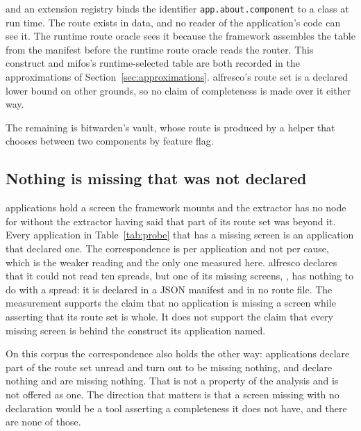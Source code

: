 \noindent
and an extension registry binds the identifier \texttt{app.about.component} to a class at run time. The route exists in data, and no reader of the application's code can see it. The runtime route oracle sees it because the framework assembles the table from the manifest before the runtime route oracle reads the router. This construct and mifos's runtime-selected table are both recorded in the approximations of Section~\ref{sec:approximations}. alfresco's route set is a declared lower bound on other grounds, so no claim of completeness is made over it either way.

The remaining \ProbeMissedBitwarden{} is bitwarden's vault, whose route is produced by a helper that chooses between two components by feature flag.

\subsection{Nothing is missing that was not declared}

\ProbeMissedWithoutDeclaration{} applications hold a screen the framework mounts and the extractor has no node for without the extractor having said that part of its route set was beyond it. Every application in Table~\ref{tab:probe} that has a missing screen is an application that declared one. The correspondence is per application and not per cause, which is the weaker reading and the only one measured here. alfresco declares that it could not read ten spreads, but one of its \ProbeMissedAlfresco{} missing screens, , has nothing to do with a spread: it is declared in a JSON manifest and in no route file. The measurement supports the claim that no application is missing a screen while asserting that its route set is whole. It does not support the claim that every missing screen is behind the construct its application named.

On this corpus the correspondence also holds the other way: \ProbeDeclaredButComplete{} applications declare part of the route set unread and turn out to be missing nothing, and \ProbeSilentAndComplete{} declare nothing and are missing nothing. That is not a property of the analysis and is not offered as one. The direction that matters is that a screen missing with no declaration would be a tool asserting a completeness it does not have, and there are none of those.

